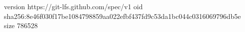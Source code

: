 version https://git-lfs.github.com/spec/v1
oid sha256:8e46f030f17be1084798859aa022efbf437fd9c53da1bc044c0316069796db5e
size 786528

